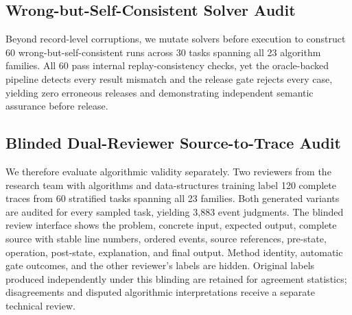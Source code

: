 \documentclass[letterpaper]{article}
\begin{document}
\subsection{Wrong-but-Self-Consistent Solver Audit}

Beyond record-level corruptions, we mutate solvers before execution to
construct 60 wrong-but-self-consistent runs across 30 tasks spanning all
23 algorithm families. All 60 pass internal replay-consistency checks,
yet the oracle-backed pipeline detects every result mismatch and the
release gate rejects every case, yielding zero erroneous releases and
demonstrating independent semantic assurance before release.

\subsection{Blinded Dual-Reviewer Source-to-Trace Audit}
\label{sec:human-trace-audit}

We therefore evaluate algorithmic validity separately. Two reviewers
from the research team with algorithms and data-structures training label 120
complete traces from 60 stratified tasks spanning all 23 families. Both
generated variants are audited for every sampled task, yielding 3,883
event judgments. The blinded review interface shows the problem,
concrete input, expected output, complete source with stable line
numbers, ordered events, source references, pre-state, operation,
post-state, explanation, and final output. Method identity, automatic
gate outcomes, and the other reviewer's labels are hidden. Original
labels produced independently under this blinding are retained for
agreement statistics; disagreements and disputed algorithmic
interpretations receive a separate technical review.
\end{document}
